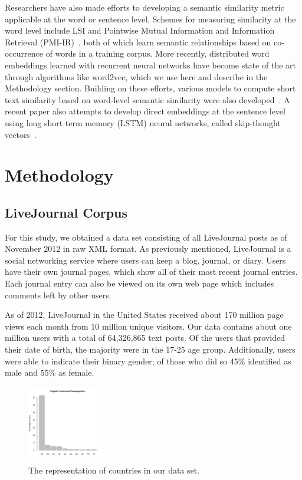 \documentclass{sigchi}
\begin{document}
Researchers have also made efforts to developing a semantic similarity metric applicable at the word or sentence level. Schemes for measuring similarity at the word level include LSI and Pointwise Mutual Information and Information Retrieval (PMI-IR)~\cite{turney2001}, both of which learn semantic relationships based on co-occurrence of words in a training corpus. More recently, distributed word embeddings learned with recurrent neural networks have become state of the art through algorithms like word2vec, which we use here and describe in the Methodology section. Building on these efforts, various models to compute short text similarity  based on  word-level semantic similarity were also developed~\cite{mihalcea2006,kenter15short}. A recent paper also attempts to develop direct embeddings at the sentence level using long short term memory (LSTM) neural networks, called skip-thought vectors~\cite{kiros2015skip}. 

\section{Methodology}

\subsection{LiveJournal Corpus}
For this study, we obtained a data set consisting of all LiveJournal posts as of November 2012 in raw XML format. As previously mentioned, LiveJournal is a social networking service where users can keep a blog, journal, or diary. Users have their own journal pages, which show all of their most recent journal entries. Each journal entry can also be viewed on its own web page which includes comments left by other users. 

As of 2012, LiveJournal in the United States received about 170 million page views each month from 10 million unique visitors. Our data contains about one million users with a total of 64,326,865 text posts. Of the users that provided their date of birth, the majority were in the 17-25 age group. Additionally, users were able to indicate their binary gender; of those who did so 45\% identified as male and 55\% as female. 

\begin{figure}[tb]
\centering \includegraphics[width=0.3\textwidth]{figures/demographics} 
\caption{The representation of countries in our data set. }
\end{figure}
\end{document}
